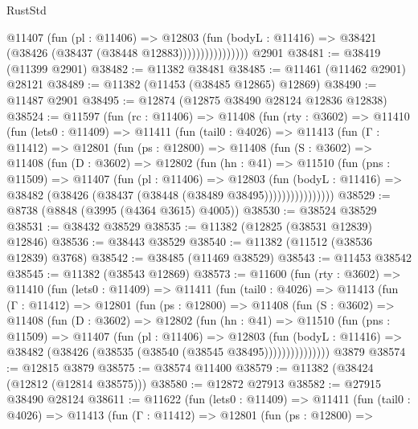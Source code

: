 \begin{lexlean}{RustStd}
\begin{coremodule}
                        @11407
                          (fun (pl : @11406) =>
                          @12803
                            (fun (bodyL : @11416) =>
                            @38421 (@38426 (@38437 (@38448 @12883))))))))))))))))
    @2901
@38481 := @38419 (@11399 @2901)
@38482 := @11382 @38481
@38485 := @11461 (@11462 @2901) @28121
@38489 := @11382 (@11453 (@38485 @12865) @12869)
@38490 := @11487 @2901
@38495 := @12874 (@12875 @38490 @28124 @12836 @12838)
@38524 := @11597
    (fun (rc : @11406) =>
    @11408
      (fun (rty : @3602) =>
      @11410
        (fun (lets0 : @11409) =>
        @11411
          (fun (tail0 : @4026) =>
          @11413
            (fun (Γ : @11412) =>
            @12801
              (fun (ps : @12800) =>
              @11408
                (fun (S : @3602) =>
                @11408
                  (fun (D : @3602) =>
                  @12802
                    (fun (hn : @41) =>
                    @11510
                      (fun (pns : @11509) =>
                      @11407
                        (fun (pl : @11406) =>
                        @12803
                          (fun (bodyL : @11416) =>
                          @38482 (@38426 (@38437 (@38448 (@38489 @38495))))))))))))))))
@38529 := @8738 (@8848 (@3995 (@4364 @3615) @4005))
@38530 := @38524 @38529
@38531 := @38432 @38529
@38535 := @11382 (@12825 (@38531 @12839) @12846)
@38536 := @38443 @38529
@38540 := @11382 (@11512 (@38536 @12839) @3768)
@38542 := @38485 (@11469 @38529)
@38543 := @11453 @38542
@38545 := @11382 (@38543 @12869)
@38573 := @11600
    (fun (rty : @3602) =>
    @11410
      (fun (lets0 : @11409) =>
      @11411
        (fun (tail0 : @4026) =>
        @11413
          (fun (Γ : @11412) =>
          @12801
            (fun (ps : @12800) =>
            @11408
              (fun (S : @3602) =>
              @11408
                (fun (D : @3602) =>
                @12802
                  (fun (hn : @41) =>
                  @11510
                    (fun (pns : @11509) =>
                    @11407
                      (fun (pl : @11406) =>
                      @12803
                        (fun (bodyL : @11416) =>
                        @38482 (@38426 (@38535 (@38540 (@38545 @38495)))))))))))))))
    @3879
@38574 := @12815 @3879
@38575 := @38574 @11400
@38579 := @11382 (@38424 (@12812 (@12814 @38575)))
@38580 := @12872 @27913
@38582 := @27915 @38490 @28124
@38611 := @11622
    (fun (lets0 : @11409) =>
    @11411
      (fun (tail0 : @4026) =>
      @11413
        (fun (Γ : @11412) =>
        @12801
          (fun (ps : @12800) =>

\end{coremodule}
\end{lexlean}
